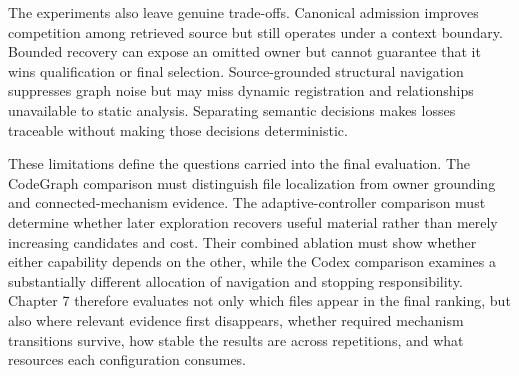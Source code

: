 The experiments also leave genuine trade-offs. Canonical admission improves competition among retrieved source but still operates under a context boundary. Bounded recovery can expose an omitted owner but cannot guarantee that it wins qualification or final selection. Source-grounded structural navigation suppresses graph noise but may miss dynamic registration and relationships unavailable to static analysis. Separating semantic decisions makes losses traceable without making those decisions deterministic.

These limitations define the questions carried into the final evaluation. The CodeGraph comparison must distinguish file localization from owner grounding and connected-mechanism evidence. The adaptive-controller comparison must determine whether later exploration recovers useful material rather than merely increasing candidates and cost. Their combined ablation must show whether either capability depends on the other, while the Codex comparison examines a substantially different allocation of navigation and stopping responsibility. Chapter 7 therefore evaluates not only which files appear in the final ranking, but also where relevant evidence first disappears, whether required mechanism transitions survive, how stable the results are across repetitions, and what resources each configuration consumes.
